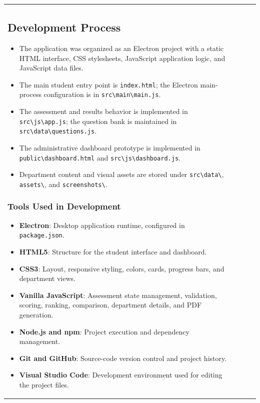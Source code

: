 \documentclass[12pt, a4paper]{article}
\begin{document}
\begin{itemize}[leftmargin=1.5em, itemsep=3pt]
\begin{table}[H]
\begin{tabularx}{\textwidth}{>{\raggedright\arraybackslash}p{0.8cm}>{\raggedright\arraybackslash}p{3.5cm}>{\raggedright\arraybackslash}X>{\raggedright\arraybackslash}p{2.5cm}}
\subsection{Development Process}

\begin{itemize}[leftmargin=1.5em, itemsep=3pt]
    \item The application was organized as an Electron project with a static HTML interface, CSS stylesheets, JavaScript application logic, and JavaScript data files.
    \item The main student entry point is \texttt{index.html}; the Electron main-process configuration is in \texttt{src\textbackslash main\textbackslash main.js}.
    \item The assessment and results behavior is implemented in \texttt{src\textbackslash js\textbackslash app.js}; the question bank is maintained in \texttt{src\textbackslash data\textbackslash questions.js}.
    \item The administrative dashboard prototype is implemented in \texttt{public\textbackslash dashboard.html} and \texttt{src\textbackslash js\textbackslash dashboard.js}.
    \item Department content and visual assets are stored under \texttt{src\textbackslash data\textbackslash}, \texttt{assets\textbackslash}, and \texttt{screenshots\textbackslash}.
\end{itemize}



\subsubsection*{Tools Used in Development}

\begin{itemize}[leftmargin=1.5em, itemsep=3pt]
    \item \textbf{Electron}: Desktop application runtime, configured in \texttt{package.json}.
    \item \textbf{HTML5}: Structure for the student interface and dashboard.
    \item \textbf{CSS3}: Layout, responsive styling, colors, cards, progress bars, and department views.
    \item \textbf{Vanilla JavaScript}: Assessment state management, validation, scoring, ranking, comparison, department details, and PDF generation.
    \item \textbf{Node.js and npm}: Project execution and dependency management.
    \item \textbf{Git and GitHub}: Source-code version control and project history.
    \item \textbf{Visual Studio Code}: Development environment used for editing the project files.
\end{itemize}


\end{tabularx}
\end{table}
\end{itemize}
\end{document}
